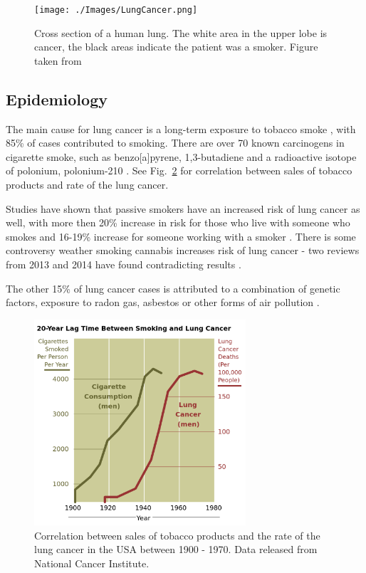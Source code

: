 \documentclass[type=dr, dr=rernat, accentcolor=tud7b,colorbacktitle, bigchapter, openright, twoside, 12pt ]{tudthesis}
\begin{document}
\begin{figure}[H]
\begin{center}
\texttt{[image: ./Images/LungCancer.png]}
\caption{Cross section of a human lung. The white area in the upper lobe is cancer, the black areas indicate the patient was a smoker. Figure taken from \cite{LungCancer}}
\label{Fig:Cancer}
\end{center}
\end{figure}


\subsection{Epidemiology}

The main cause for lung cancer is a long-term exposure to tobacco smoke \cite{Tsao2008}, with 85\% of cases contributed to smoking. There are over 70 known carcinogens in cigarette smoke, such as benzo[a]pyrene, 1,3-butadiene and a radioactive isotope of polonium, polonium-210 \cite{Hecht2012}. See Fig.~\ref{Fig:Smoking} for correlation between sales of tobacco products and rate of the lung cancer.

Studies have shown that passive smokers have an increased risk of lung cancer as well, with more then 20\% increase in risk for those who live with someone who smokes and 16-19\% increase for someone working with a smoker \cite{Taylor2007}.
There is some controversy weather smoking cannabis increases risk of lung cancer - two reviews from 2013 and 2014 have found contradicting results \cite{Tasckin2013, Underner2014}.

The other 15\% of lung cancer cases is attributed to a combination of genetic factors, exposure to radon gas, asbestos or other forms of air pollution \cite{Alberg2010}.

\begin{figure}[H]
	\begin{center}
		\includegraphics[width=0.7\textwidth]{./Images/Smoking.png}
		\caption{Correlation between sales of tobacco products and the rate of the lung cancer in the USA between 1900 - 1970. Data released from National Cancer Institute.}
		\label{Fig:Smoking}
	\end{center}
\end{figure}
\end{document}
